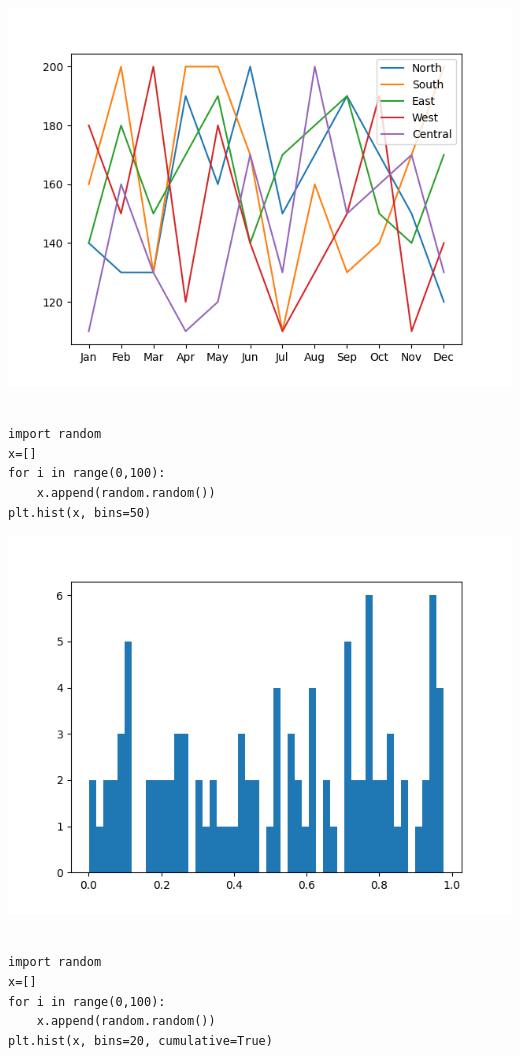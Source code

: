 \documentclass[11pt]{article}
\begin{document}
\begin{center}
\includegraphics[width=.9\linewidth]{fig12.png}
\end{center}

\newpage
\begin{verbatim}

import random
x=[]
for i in range(0,100):
    x.append(random.random())
plt.hist(x, bins=50)

\end{verbatim}

\begin{center}
\includegraphics[width=.9\linewidth]{fig13.png}
\end{center}

\newpage
\begin{verbatim}

import random
x=[]
for i in range(0,100):
    x.append(random.random())
plt.hist(x, bins=20, cumulative=True)

\end{verbatim}
\end{document}
